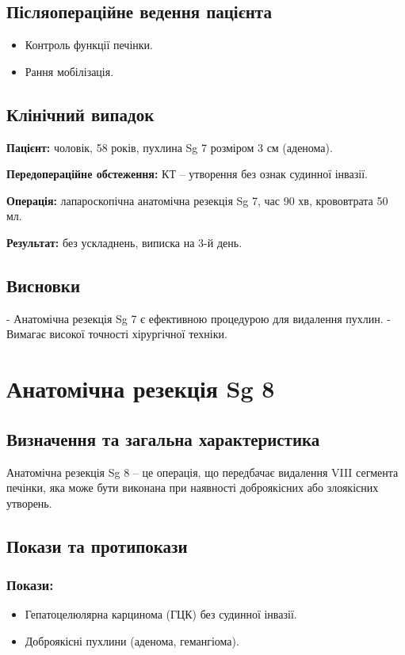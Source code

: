 \begin{refsection}
\subsection{Післяопераційне ведення пацієнта}
\begin{itemize}
    \item Контроль функції печінки.
    \item Рання мобілізація.
\end{itemize}

\subsection{Клінічний випадок}
\textbf{Пацієнт:} чоловік, 58 років, пухлина Sg 7 розміром 3 см (аденома).

\textbf{Передопераційне обстеження:} КТ – утворення без ознак судинної інвазії.

\textbf{Операція:} лапароскопічна анатомічна резекція Sg 7, час 90 хв, крововтрата 50 мл.

\textbf{Результат:} без ускладнень, виписка на 3-й день.

\subsection{Висновки}
- Анатомічна резекція Sg 7 є ефективною процедурою для видалення пухлин.
- Вимагає високої точності хірургічної техніки.

\section{Анатомічна резекція Sg 8}
\subsection{Визначення та загальна характеристика}
Анатомічна резекція Sg 8 – це операція, що передбачає видалення VIII сегмента печінки, яка може бути виконана при наявності доброякісних або злоякісних утворень.

\subsection{Покази та протипокази}
\subsubsection{Покази:}
\begin{itemize}
    \item Гепатоцелюлярна карцинома (ГЦК) без судинної інвазії.
    \item Доброякісні пухлини (аденома, гемангіома).
\end{itemize}


\end{refsection}
